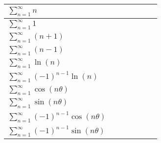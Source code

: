 \documentclass[12pt]{article}
\newcommand{\cmark}{\ding{51}}
\newcommand{\xmark}{\ding{55}}
\begin{document}
\begin{tabular}{|l|c|c|c|c|c|c|}
$\sum_{n=1}^{\infty} n$ & \textcolor{Red}{\xmark} & \textcolor{Red}{\xmark} & \textcolor{Red}{\xmark} & \textcolor{Green}{\cmark} & \textcolor{Red}{\xmark} & \textcolor{Green}{\cmark} \\ \hline

$\sum_{n=1}^{\infty} 1$ & \textcolor{Red}{\xmark} & \textcolor{Red}{\xmark} & \textcolor{Red}{\xmark} & \textcolor{Green}{\cmark} & \textcolor{Red}{\xmark} & \textcolor{Green}{\cmark} \\ \hline

$\sum_{n=1}^{\infty} (n+1)$ & \textcolor{Red}{\xmark} & \textcolor{Red}{\xmark} & \textcolor{Red}{\xmark} & \textcolor{Green}{\cmark} & \textcolor{Red}{\xmark} & \textcolor{Green}{\cmark} \\ \hline

$\sum_{n=1}^{\infty} (n-1)$ & \textcolor{Red}{\xmark} & \textcolor{Red}{\xmark} & \textcolor{Red}{\xmark} & \textcolor{Green}{\cmark} & \textcolor{Red}{\xmark} & \textcolor{Green}{\cmark} \\ \hline

$\sum_{n=1}^{\infty} \ln(n)$ & \textcolor{Red}{\xmark} & \textcolor{Red}{\xmark} & \textcolor{Red}{\xmark} & \textcolor{Green}{\cmark} & \textcolor{Red}{\xmark} & \textcolor{Green}{\cmark} \\ \hline

$\sum_{n=1}^{\infty} (-1)^{n-1} \ln(n)$ & \textcolor{Red}{\xmark} & \textcolor{Red}{\xmark} & \textcolor{Red}{\xmark} & \textcolor{Green}{\cmark} & \textcolor{Red}{\xmark} & \textcolor{Green}{\cmark} \\ \hline

$\sum_{n=1}^{\infty} \cos (n\theta)$ & \textcolor{Red}{\xmark} & \textcolor{Green}{\cmark} & \textcolor{Red}{\xmark} & \textcolor{Green}{\cmark} & \textcolor{Red}{\xmark} & \textcolor{Green}{\cmark} \\ \hline

$\sum_{n=1}^{\infty} \sin (n\theta)$ & \textcolor{Red}{\xmark} & \textcolor{Green}{\cmark} & \textcolor{Red}{\xmark} & \textcolor{Green}{\cmark} & \textcolor{Red}{\xmark} & \textcolor{Green}{\cmark} \\ \hline

$\sum_{n=1}^{\infty} (-1)^{n-1} \cos (n\theta)$ & \textcolor{Green}{\cmark} & \textcolor{Green}{\cmark} & \textcolor{Green}{\cmark} & \textcolor{Green}{\cmark} & \textcolor{Green}{\cmark} & \textcolor{Green}{\cmark} \\ \hline

$\sum_{n=1}^{\infty} (-1)^{n-1} \sin (n\theta)$ & \textcolor{Green}{\cmark} & \textcolor{Green}{\cmark} & \textcolor{Green}{\cmark} & \textcolor{Green}{\cmark} & \textcolor{Green}{\cmark} & \textcolor{Green}{\cmark} \\ \hline


\end{tabular}
\end{document}
